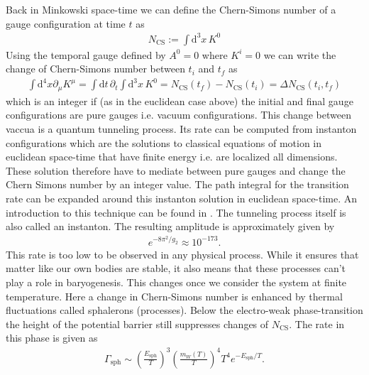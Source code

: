 \documentclass[13pt,a4paper,titlepage]{article}
\begin{document}
\noindent
Back in Minkowski space-time we can define the Chern-Simons number of a gauge configuration at time $t$ as \cite[eq. 23]{Dine_2003_Bayrogenesis}
\begin{align}
    N_{\mathrm{CS}} := \int \mathrm{d}^3 x \, K^0
\end{align}
Using the temporal gauge \cite{temporal_gauge_10.1007/BFb0015141} defined by $A^0 = 0$ where $K^i = 0$ we can
write the change of Chern-Simons number between $t_i$ and $t_f$ as
\begin{align}
    \int \mathrm{d}^4 x \partial_\mu K^\mu = \int \mathrm{d} t \, \partial_t \int \mathrm{d}^3 x \, K^0 =
    N_{\mathrm{CS}}(t_f) - N_{\mathrm{CS}}(t_i) = \Delta N_{\mathrm{CS}}(t_i, t_f)
\end{align}
which is an integer if (as in the euclidean case above) the initial and final gauge configurations are pure gauges i.e. vacuum configurations.
This change between vaccua is a quantum tunneling process. Its rate can be computed from instanton configurations which are the solutions to classical equations of motion in euclidean space-time that have finite energy i.e. are localized all dimensions. These solution therefore have to mediate between pure  gauges and change the Chern Simons number by an integer value.
The path integral for the transition rate can be expanded around this instanton solution in euclidean space-time. An introduction to this technique can be found in \cite[Chap. 7]{aspects_of_symmmetry}. The tunneling process itself is also called an instanton.
The resulting amplitude is approximately given by \cite[4.8]{Cline:2006ts_Baryogenesis}
\begin{align}
    e^{-8 \pi^2 / g_2} \approx 10^{-173}.
\end{align}
This rate is too low to be observed in any physical process. While it ensures
that matter like our own bodies are stable, it also means that these processes
can't play a role in baryogenesis.
This changes once we consider the system at finite temperature.
Here a change in Chern-Simons number is enhanced by thermal fluctuations called sphalerons (processes).
Below the electro-weak phase-transition the height of the potential barrier still
suppresses changes of $N_{\mathrm{CS}}$.
The rate in this phase is given as \cite[eq. 4.10]{Cline:2006ts_Baryogenesis}
\begin{align}
    \Gamma_{\mathrm{sph}} \sim \left( \frac{E_{\mathrm{sph}}}{T} \right)^3 \left( \frac{m_W(T)}{T} \right)^4 T^4 e^{- E_{\mathrm{sph}} / T}.
\end{align}
\end{document}
